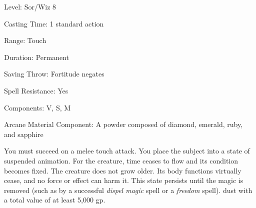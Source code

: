 
\begin{description*}
\item[Level:] Sor/Wiz 8
\item[Casting Time:] 1 standard action
\item[Range:] Touch
\item[Duration:] Permanent
\item[Saving Throw:] Fortitude negates
\item[Spell Resistance:] Yes
\item[Components:] V, S, M
\item[Arcane Material Component:] A powder composed of diamond, emerald, ruby, and sapphire
\end{description*}

You must succeed on a melee touch attack. You place the subject into a state of
suspended animation. For the creature, time ceases to flow and its condition becomes
fixed. The creature does not grow older. Its body functions virtually cease, and
no force or effect can harm it. This state persists until the magic is removed
(such as by a successful \textit{dispel magic} spell or a \textit{freedom} spell).
dust with a total value of at least 5,000 gp.
